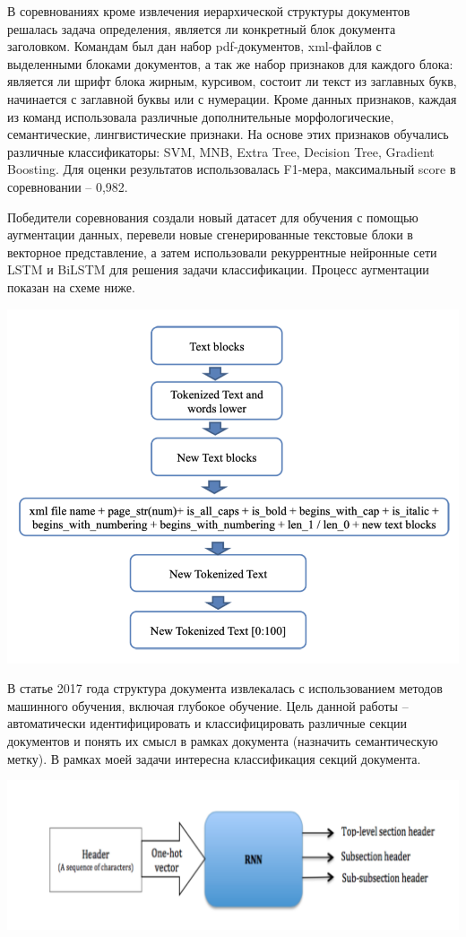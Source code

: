 \documentclass[a4paper,12pt]{article}
\begin{document}
В соревнованиях \cite{link2} кроме извлечения иерархической структуры документов решалась задача определения, является ли конкретный блок документа заголовком. Командам был дан набор pdf-документов, xml-файлов с выделенными блоками документов, а так же набор признаков для каждого блока: является ли шрифт блока жирным, курсивом, состоит ли текст из заглавных букв, начинается с заглавной буквы или с нумерации. Кроме данных признаков, каждая из команд использовала различные дополнительные морфологические, семантические, лингвистические признаки. На основе этих признаков обучались различные классификаторы: SVM, MNB, Extra Tree, Decision Tree, Gradient Boosting. Для оценки результатов использовалась F1-мера, максимальный score в соревновании -- 0,982.

Победители соревнования \cite{link4} создали новый датасет для обучения с помощью аугментации данных, перевели новые сгенерированные текстовые блоки в векторное представление, а затем использовали рекуррентные нейронные сети LSTM и BiLSTM для решения задачи классификации. Процесс аугментации показан на схеме ниже.

\begin{center}
\includegraphics[height=0.5\textwidth]{pics/augmentation.png}
\end{center}

В статье \cite{link5} 2017 года структура документа извлекалась с использованием методов машинного обучения, включая глубокое обучение. Цель данной работы -- автоматически идентифицировать и классифицировать различные секции документов и понять их смысл в рамках документа (назначить семантическую метку). В рамках моей задачи интересна классификация секций документа.

\begin{center}
\includegraphics[width=1.0\textwidth]{pics/classifier.png}
\end{center}
\end{document}
